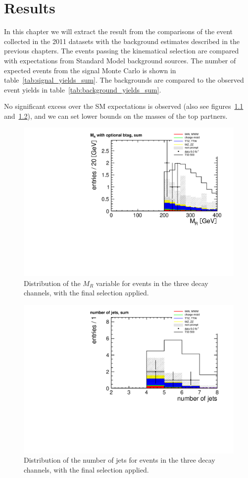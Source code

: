\chapter{Results}
In this chapter we will extract the result from the comparisons of the event collected in the 2011 datasets with the
background estimates described in the previous chapters.
The events passing the kinematical selection are compared with expectations
from Standard Model background sources. The number of expected events from
the signal Monte Carlo is shown in table~\ref{tab:signal_yields_sum}. The
backgrounds are compared to the observed event yields in
table~\ref{tab:background_yields_sum}.


No significant excess over the SM expectations is observed (also see
figures~\ref{fig:mr_data} and~\ref{fig:n_jets_data}), and we can set
lower bounds on the masses of the top partners.

\begin{figure}[htb]
    \centering
    \includegraphics[width=.8\textwidth]{images/pdf/4jets_AND_mr200_AND_r02_AND_had_mass350/mr_optional_btag_sum_1}
    \caption{Distribution of the $M_R$ variable for events in the three decay
        channels, with the final
        selection applied.}
    \label{fig:mr_data}
\end{figure}

\begin{figure}[htb]
    \centering
    \includegraphics[width=.8\textwidth]{images/pdf/4jets_AND_mr200_AND_r02_AND_had_mass350/n_jets_sum_1}
    \caption{Distribution of the number of jets for events in the three decay
        channels, with the final
        selection applied.}
    \label{fig:n_jets_data}
\end{figure}

